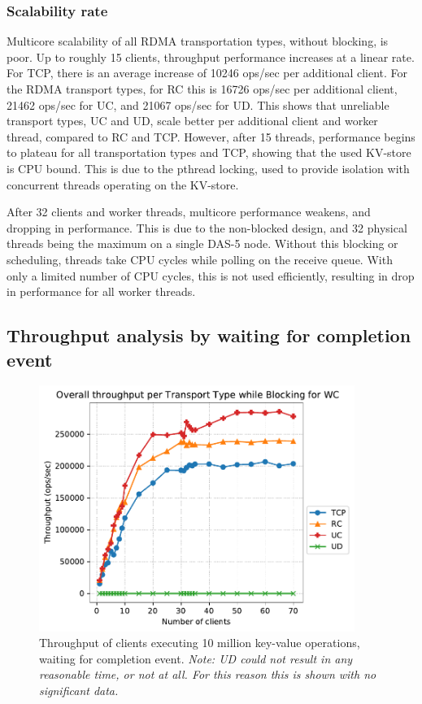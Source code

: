 \subsubsection{Scalability rate}\label{subsec:scalability-rate}
Multicore scalability of all RDMA transportation types, without blocking, is poor.
Up to roughly 15 clients, throughput performance increases at a linear rate.
For TCP, there is an average increase of 10246 ops/sec per additional client.
For the RDMA transport types, for RC this is 16726 ops/sec per additional client, 21462 ops/sec for UC, and 21067 ops/sec for UD.
This shows that unreliable transport types, UC and UD, scale better per additional client and worker thread, compared to RC and TCP.
However, after 15 threads, performance begins to plateau for all transportation types and TCP, showing that the used KV-store is CPU bound.
This is due to the pthread locking, used to provide isolation with concurrent threads operating on the KV-store.

After 32 clients and worker threads, multicore performance weakens, and dropping in performance.
This is due to the non-blocked design, and 32 physical threads being the maximum on a single DAS-5 node.
Without this blocking or scheduling, threads take CPU cycles while polling on the receive queue.
With only a limited number of CPU cycles, this is not used efficiently, resulting in drop in performance for all worker threads.

\subsection{Throughput analysis by waiting for completion event}
\begin{figure}
    \centering
    \includegraphics[height=8cm]{figures/PDF/Throughput_70_blocking}
    \caption[Throughput of clients executing 10 million key-value operations, waiting for completion event.]{Throughput of clients executing 10 million key-value operations, waiting for completion event. \textit{Note: UD could not result in any reasonable time, or not at all. For this reason this is shown with no significant data.}}
    \label{fig:throughput-70-block}
\end{figure}

